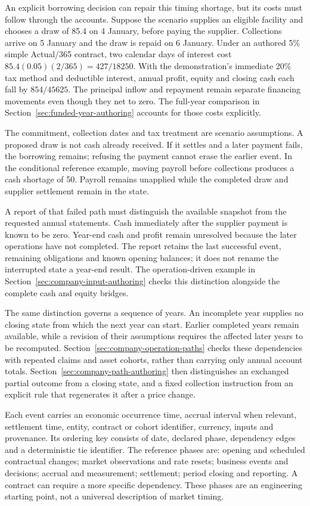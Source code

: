 An explicit borrowing decision can repair this timing shortage, but its costs
must follow through the accounts. Suppose the scenario supplies an eligible
facility and chooses a draw of 85.4 on 4 January, before paying the supplier.
Collections arrive on 5 January and the draw is repaid on 6 January. Under an
authored 5\% simple Actual/365 contract, two calendar days of interest cost
\(85.4(0.05)(2/365)=427/18250\). With the demonstration's immediate 20\% tax
method and deductible interest, annual profit, equity and closing cash each
fall by \(854/45625\). The principal inflow and repayment remain separate
financing movements even though they net to zero. The full-year comparison
in Section~\ref{sec:funded-year-authoring} accounts for those costs explicitly.

The commitment, collection dates and tax treatment are scenario assumptions.
A proposed draw is not cash already received. If it settles and a later
payment fails, the borrowing remains; refusing the payment cannot erase the
earlier event. In the conditional reference example, moving payroll before
collections produces a cash shortage of 50. Payroll remains unapplied while
the completed draw and supplier settlement remain in the state.

A report of that failed path must distinguish the available snapshot from
the requested annual statements. Cash immediately after the supplier payment
is known to be zero. Year-end cash and profit remain unresolved because the
later operations have not completed. The report retains the last successful
event, remaining obligations and known opening balances; it does not rename
the interrupted state a year-end result. The operation-driven example in
Section~\ref{sec:company-input-authoring} checks this distinction alongside
the complete cash and equity bridges.

The same distinction governs a sequence of years. An incomplete year supplies
no closing state from which the next year can start. Earlier completed years
remain available, while a revision of their assumptions requires the affected
later years to be recomputed. Section~\ref{sec:company-operation-paths}
checks these dependencies with repeated claims and asset cohorts, rather than
carrying only annual account totals.
Section~\ref{sec:company-path-authoring} then distinguishes an exchanged partial
outcome from a closing state, and a fixed collection instruction from an
explicit rule that regenerates it after a price change.

Each event carries an economic occurrence time, accrual interval when relevant,
settlement time, entity, contract or cohort identifier, currency, inputs and
provenance. Its ordering key consists of date, declared phase, dependency edges
and a deterministic tie identifier. The reference phases are: opening and
scheduled contractual changes; market observations and rate resets; business
events and decisions; accrual and measurement; settlement; period closing and
reporting. A contract can require a more specific dependency. These phases are
an engineering starting point, not a universal description of market timing.

